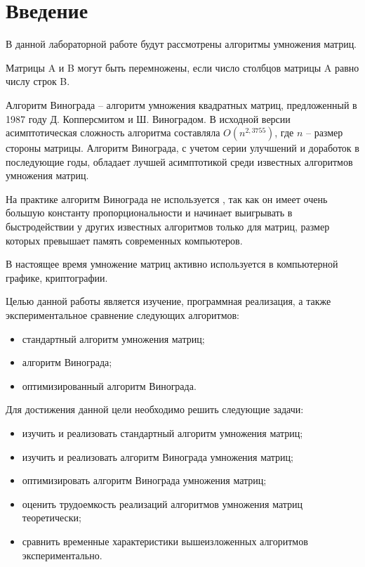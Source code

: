 \chapter*{Введение}

В данной лабораторной работе будут рассмотрены алгоритмы умножения матриц.

Матрицы A и B могут быть перемножены, если число столбцов матрицы A равно числу строк B. 

Алгоритм Винограда -- алгоритм умножения квадратных матриц, предложенный в 1987 году Д. Копперсмитом и Ш. Виноградом. В исходной версии асимптотическая сложность алгоритма составляла $O(n^{2,3755})$, где $n$ -- размер стороны матрицы. Алгоритм Винограда, с учетом серии улучшений и доработок в последующие годы, обладает лучшей асимптотикой среди известных алгоритмов умножения матриц.

На практике алгоритм Винограда не используется \cite{alg}, так как он имеет очень большую константу пропорциональности и начинает выигрывать в быстродействии у других известных алгоритмов только для матриц, размер которых превышает память современных компьютеров.

В настоящее время умножение матриц активно используется в компьютерной графике, криптографии.

Целью данной работы является изучение, программная реализация, а также экспериментальное сравнение следующих алгоритмов:
\begin{itemize}
	\item стандартный алгоритм умножения матриц;
	\item алгоритм Винограда;
	\item оптимизированный алгоритм Винограда.
\end{itemize}

Для достижения данной цели необходимо решить следующие задачи:
\begin{itemize}
	\item изучить и реализовать стандартный алгоритм умножения матриц;
	\item изучить и реализовать алгоритм Винограда умножения матриц;
	\item оптимизировать алгоритм Винограда умножения матриц;
	\item оценить трудоемкость реализаций алгоритмов умножения матриц теоретически;
	\item сравнить временные характеристики вышеизложенных алгоритмов экспериментально.
\end{itemize}